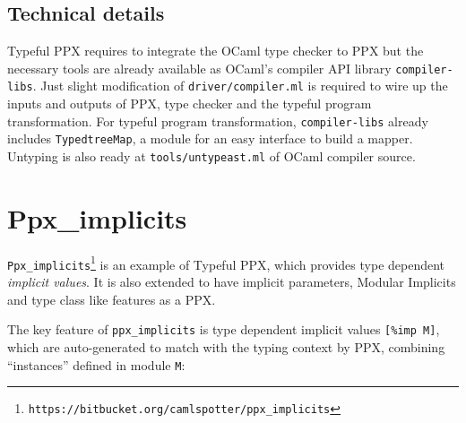 \documentclass{article}
\begin{document}
\subsection{Technical details}\label{technical-details}

Typeful PPX requires to integrate the OCaml type checker to PPX
but the necessary tools are already available as OCaml's compiler API
library \texttt{compiler-libs}. Just slight modification of
\texttt{driver/compiler.ml} is required to wire up the inputs and
outputs of PPX, type checker and the typeful program transformation.
For typeful program transformation, \texttt{compiler-libs} already
includes \texttt{TypedtreeMap}, a module for an easy interface to build
a mapper. 
Untyping is also ready at
\texttt{tools/untypeast.ml} of OCaml compiler source.

\section{Ppx\_implicits}\label{ppxux5fimplicits}

\texttt{Ppx\_implicits}\footnote{ \texttt{https://bitbucket.org/camlspotter/ppx\_implicits} } is an example of Typeful
PPX, which provides type dependent \emph{implicit values}. It is also
extended to have implicit parameters\cite{scalaimplicits}, Modular Implicits\cite{ocamlimplicits}
and type class\cite{typeclass} like features as a PPX.


The key feature of \texttt{ppx\_implicits} is type dependent
implicit values \texttt{[\%imp M]}, which are auto-generated
to match with the typing context by PPX, combining 
``instances'' defined in module \texttt{M}:
\end{document}
